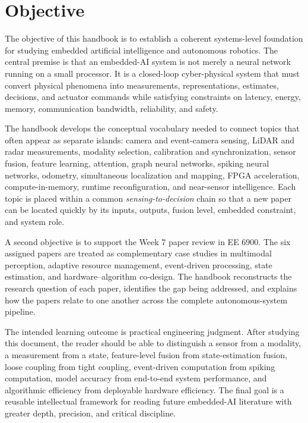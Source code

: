 \chapter*{Objective}

The objective of this handbook is to establish a coherent systems-level foundation for studying embedded artificial intelligence and autonomous robotics. The central premise is that an embedded-AI system is not merely a neural network running on a small processor. It is a closed-loop cyber-physical system that must convert physical phenomena into measurements, representations, estimates, decisions, and actuator commands while satisfying constraints on latency, energy, memory, communication bandwidth, reliability, and safety.

The handbook develops the conceptual vocabulary needed to connect topics that often appear as separate islands: camera and event-camera sensing, LiDAR and radar measurements, modality selection, calibration and synchronization, sensor fusion, feature learning, attention, graph neural networks, spiking neural networks, odometry, simultaneous localization and mapping, FPGA acceleration, compute-in-memory, runtime reconfiguration, and near-sensor intelligence. Each topic is placed within a common \emph{sensing-to-decision} chain so that a new paper can be located quickly by its inputs, outputs, fusion level, embedded constraint, and system role.

A second objective is to support the Week 7 paper review in EE 6900. The six assigned papers are treated as complementary case studies in multimodal perception, adaptive resource management, event-driven processing, state estimation, and hardware--algorithm co-design. The handbook reconstructs the research question of each paper, identifies the gap being addressed, and explains how the papers relate to one another across the complete autonomous-system pipeline.

The intended learning outcome is practical engineering judgment. After studying this document, the reader should be able to distinguish a sensor from a modality, a measurement from a state, feature-level fusion from state-estimation fusion, loose coupling from tight coupling, event-driven computation from spiking computation, model accuracy from end-to-end system performance, and algorithmic efficiency from deployable hardware efficiency. The final goal is a reusable intellectual framework for reading future embedded-AI literature with greater depth, precision, and critical discipline.
